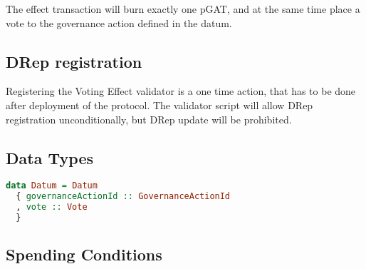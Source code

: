 \documentclass{article}
\begin{document}
The effect transaction will burn exactly one pGAT, and at the same time place a vote to the governance action defined in the datum.

\subsection*{DRep registration}

Registering the Voting Effect validator is a one time action, that has to be done after deployment of the protocol.
The validator script will allow DRep registration unconditionally, but DRep update will be prohibited.

\subsection*{Data Types}

\begin{lstlisting}[language=Haskell]
data Datum = Datum
  { governanceActionId :: GovernanceActionId
  , vote :: Vote
  }
\end{lstlisting}

\subsection*{Spending Conditions}
\end{document}
